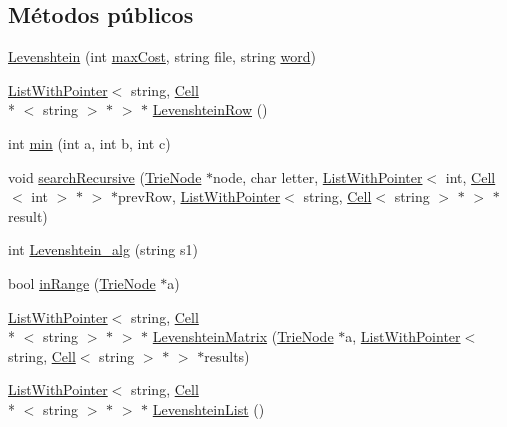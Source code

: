 \subsection*{Métodos públicos}
\begin{DoxyCompactItemize}
\item 
\hyperlink{class_levenshtein_aa896d5d6920c0457cf5591e5ddfb4605}{Levenshtein} (int \hyperlink{class_levenshtein_aefd28eb150c7d3baf3448551d18f9c9d}{max\-Cost}, string file, string \hyperlink{class_levenshtein_ae0f3d52b4b02545b63e94509e0df0a85}{word})
\item 
\hyperlink{class_list_with_pointer}{List\-With\-Pointer}$<$ string, \hyperlink{class_cell}{Cell}\\*
$<$ string $>$ $\ast$ $>$ $\ast$ \hyperlink{class_levenshtein_ada76c099240f39f30ddea66838457f48}{Levenshtein\-Row} ()
\item 
int \hyperlink{class_levenshtein_a9d2b5ce5ae0292dad55f8ac600b221ae}{min} (int a, int b, int c)
\item 
void \hyperlink{class_levenshtein_a6d7f860c3c07f37009f26ea1ab391cb8}{search\-Recursive} (\hyperlink{class_trie_node}{Trie\-Node} $\ast$node, char letter, \hyperlink{class_list_with_pointer}{List\-With\-Pointer}$<$ int, \hyperlink{class_cell}{Cell}$<$ int $>$ $\ast$ $>$ $\ast$prev\-Row, \hyperlink{class_list_with_pointer}{List\-With\-Pointer}$<$ string, \hyperlink{class_cell}{Cell}$<$ string $>$ $\ast$ $>$ $\ast$result)
\item 
int \hyperlink{class_levenshtein_a11fa7f55b25f9782242c4b5f8d05bd7d}{Levenshtein\-\_\-alg} (string s1)
\item 
bool \hyperlink{class_levenshtein_aa1cb5956d10477a430a0a70662a1fe27}{in\-Range} (\hyperlink{class_trie_node}{Trie\-Node} $\ast$a)
\item 
\hyperlink{class_list_with_pointer}{List\-With\-Pointer}$<$ string, \hyperlink{class_cell}{Cell}\\*
$<$ string $>$ $\ast$ $>$ $\ast$ \hyperlink{class_levenshtein_af89cb29073a5937b3a4357e7cdf20b9a}{Levenshtein\-Matrix} (\hyperlink{class_trie_node}{Trie\-Node} $\ast$a, \hyperlink{class_list_with_pointer}{List\-With\-Pointer}$<$ string, \hyperlink{class_cell}{Cell}$<$ string $>$ $\ast$ $>$ $\ast$results)
\item 
\hyperlink{class_list_with_pointer}{List\-With\-Pointer}$<$ string, \hyperlink{class_cell}{Cell}\\*
$<$ string $>$ $\ast$ $>$ $\ast$ \hyperlink{class_levenshtein_a2b05398d19d1e0f987bd26d0584965b9}{Levenshtein\-List} ()
\end{DoxyCompactItemize}
